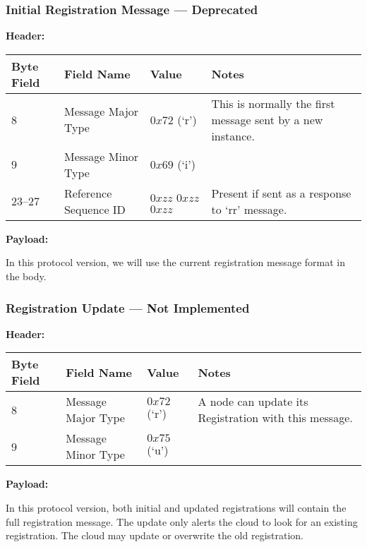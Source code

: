 \subsubsection{Initial Registration Message --- Deprecated}
\textbf{Header:}
\begin{center}
    \begin{tabular}{ | l | l | p{3cm} | p{5cm} |}
    \hline
    \hline
    \textbf{Byte Field} & \textbf{Field Name} & \textbf{Value} & \textbf{Notes} \\ \hline \hline
    8 & Message Major Type & $0x72$ (`r') & This is normally the first message sent by a new instance. \\    \hline
    9 & Message Minor Type & $0x69$ (`i') &  \\    \hline
    23--27 & Reference Sequence ID & $0xzz$ $0xzz$ $0xzz$ & Present if sent as a response to `rr' message.\\ \hline
    \end{tabular}
\end{center}
\noindent
\textbf{Payload:}
\begin{framed}
In this protocol version, we will use the current registration message format in the body.
\end{framed}


\subsubsection{Registration Update --- Not Implemented}
\textbf{Header:}
\begin{center}
    \begin{tabular}{ | l | l | p{3cm} | p{5cm} |}
    \hline
    \hline
    \textbf{Byte Field} & \textbf{Field Name} & \textbf{Value} & \textbf{Notes} \\ \hline \hline
    8 & Message Major Type & $0x72$ (`r') & A node can update its Registration with this message. \\    \hline
    9 & Message Minor Type & $0x75$ (`u') &  \\    \hline
    \end{tabular}
\end{center}
\noindent
\textbf{Payload:}
\begin{framed}
In this protocol version, both initial and updated registrations will contain the full
registration message. The update only alerts the cloud to look for an existing registration.
The cloud may update or overwrite the old registration.
\end{framed}

